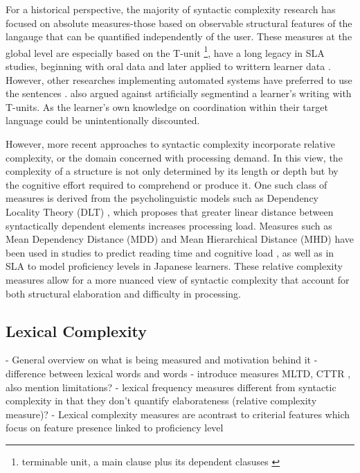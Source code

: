 For a historical perspective, the majority of syntactic complexity research has focused on absolute measures-those 
based on observable structural features of the langauge that can be quantified independently of the user. These 
measures at the global level are especially based on the T-unit
\footnote{terminable unit, a main clause plus its dependent clasuses
\cite{hunt1965}}, have a long legacy in SLA studies, beginning with oral data \cite{hunt1965} and later applied to
writtern learner data \cite{Ortega2003,Lu2011}. However, other researches implementing automated systems have
preferred to use the sentences \cite{Vyatkina2012,Lu2010}. \citet{Bardovi-Harlig1992} also argued against
artificially segmentind a learner's writing with T-units. As the learner's own knowledge on coordination within
their target language could be unintentionally discounted.

However, more recent approaches to syntactic complexity incorporate relative complexity, or the domain concerned
with processing demand. In this view, the complexity of a structure is not only determined by its length or depth
but by the cognitive effort required to comprehend or produce it. One such class of measures is derived from the 
psycholinguistic models such as Dependency Locality Theory (DLT) \cite{Gibson2000}, which proposes that greater linear distance 
between syntactically dependent elements increases processing load. Measures such as Mean Dependency Distance (MDD)\cite{Liu2008} and Mean Hierarchical Distance (MHD) \cite{Liu2017} have been used in studies to predict reading time and cognitive load \cite{shain2016, Feng2009}, as well as in SLA to model proficiency levels in Japanese learners\cite{Jiang2019,komori2019,Yang2023}. These relative complexity measures allow for a more nuanced view of syntactic complexity that account for both structural elaboration and difficulty in processing. %


\subsection{Lexical Complexity}
- General overview on what is being measured and motivation behind it
    -difference between lexical words and words
- introduce measures MLTD, CTTR , also mention limitations?
- lexical frequency measures different from syntactic complexity in that they don't quantify elaborateness (relative
complexity measure)?
- Lexical complexity measures are acontrast to criterial features which focus on feature presence linked to proficiency
level

